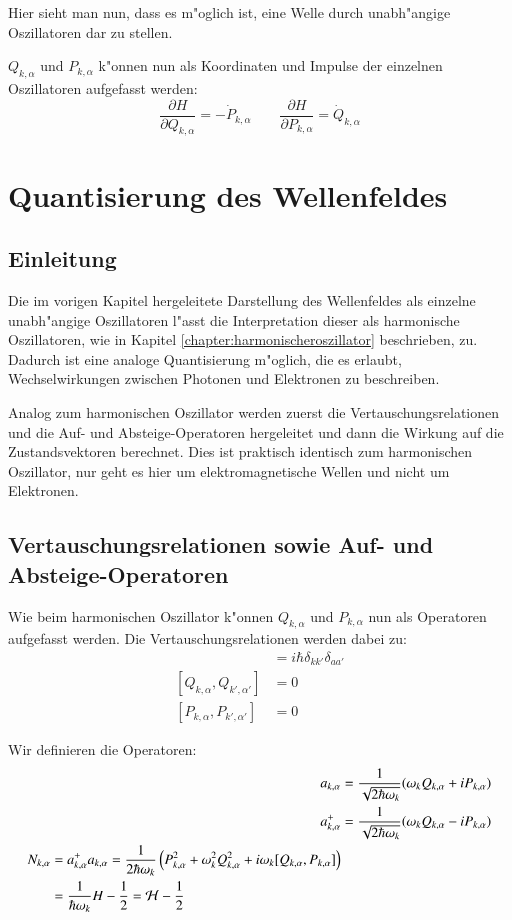 Hier sieht man nun, dass es m"oglich ist, eine Welle durch unabh"angige Oszillatoren dar zu stellen.

$Q_{k,\alpha}$ und $P_{k,\alpha}$ k"onnen nun als Koordinaten und Impulse der einzelnen Oszillatoren aufgefasst werden:
\begin{equation*}
\dfrac{\partial H}{\partial Q_{k,\alpha}} = -\dot{P}_{k,\alpha} \qquad \dfrac{\partial H}{\partial P_{k,\alpha}} = \dot{Q}_{k,\alpha}
\end{equation*}

\section{Quantisierung des Wellenfeldes}

\subsection{Einleitung}
Die im vorigen Kapitel hergeleitete Darstellung des Wellenfeldes als einzelne unabh"angige Oszillatoren l"asst die Interpretation dieser als harmonische Oszillatoren, wie in Kapitel \ref{chapter:harmonischeroszillator} beschrieben, zu. Dadurch ist eine analoge Quantisierung m"oglich, die es erlaubt, Wechselwirkungen zwischen Photonen und Elektronen zu beschreiben.

Analog zum harmonischen Oszillator werden zuerst die Vertauschungsrelationen und die Auf- und Absteige-Operatoren hergeleitet und dann die Wirkung auf die Zustandsvektoren berechnet. Dies ist praktisch identisch zum harmonischen Oszillator, nur geht es hier um elektromagnetische Wellen und nicht um Elektronen.

\subsection{Vertauschungsrelationen sowie Auf- und Absteige-Operatoren}
Wie beim harmonischen Oszillator k"onnen $Q_{k,\alpha}$ und $P_{k,\alpha}$ nun als Operatoren aufgefasst werden. Die Vertauschungsrelationen werden dabei zu:
\begin{align*}
[Q_{k,\alpha}, P_{k',\alpha'}] &= i \hbar \delta_{kk'}\delta_{aa'} \\
[Q_{k,\alpha}, Q_{k',\alpha'}] &= 0 \\
[P_{k,\alpha}, P_{k',\alpha'}] &= 0
\end{align*}

Wir definieren die Operatoren:
\begin{align*}
a_{k,\alpha} &= \frac{1}{\sqrt{2 \hbar \omega_k}} (\omega_k Q_{k,\alpha} + iP_{k,\alpha}) \\
a^+_{k,\alpha} &= \frac{1}{\sqrt{2 \hbar \omega_k}} (\omega_k Q_{k,\alpha} - iP_{k,\alpha})\\
\begin{split}
N_{k,\alpha} &= a^+_{k,\alpha} a_{k,\alpha} = \frac{1}{2 \hbar \omega_k} \left(P_{k,\alpha}^2 + \omega_k^2 Q_{k,\alpha}^2 + i\omega_k [Q_{k,\alpha},P_{k,\alpha}] \right) \\
 &= \frac{1}{ \hbar \omega_k } H - \frac{1}{2} = {\cal H} - \frac{1}{2}
\end{split}
\end{align*}

